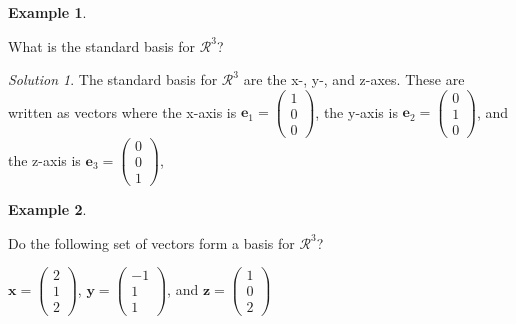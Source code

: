 \documentclass[
]{book}
\theoremstyle{definition}
\theoremstyle{definition}
\newtheorem{example}{Example}[chapter]
\theoremstyle{definition}
\theoremstyle{remark}
\newtheorem*{solution}{Solution}
\begin{document}
\begin{example}
\protect\hypertarget{exm:unlabeled-div-87}{}\label{exm:unlabeled-div-87}

What is the standard basis for \(\mathcal{R}^3\)?

\end{example}

\begin{solution}

The standard basis for \(\mathcal{R}^3\) are the x-, y-, and z-axes. These are written as vectors where the x-axis is \(\mathbf{e}_1 = \begin{pmatrix} 1 \\ 0 \\ 0 \end{pmatrix}\), the y-axis is \(\mathbf{e}_2 = \begin{pmatrix} 0 \\ 1 \\ 0 \end{pmatrix}\), and the z-axis is \(\mathbf{e}_3 = \begin{pmatrix} 0 \\ 0 \\ 1\end{pmatrix}\),

\end{solution}

\begin{example}
\protect\hypertarget{exm:unlabeled-div-88}{}\label{exm:unlabeled-div-88}

Do the following set of vectors form a basis for \(\mathcal{R}^3\)?

\(\mathbf{x} = \begin{pmatrix} 2 \\ 1 \\ 2 \end{pmatrix}\), \(\mathbf{y} = \begin{pmatrix} -1 \\ 1 \\ 1 \end{pmatrix}\), and \(\mathbf{z} = \begin{pmatrix} 1 \\ 0 \\ 2 \end{pmatrix}\)

\end{example}
\end{document}
